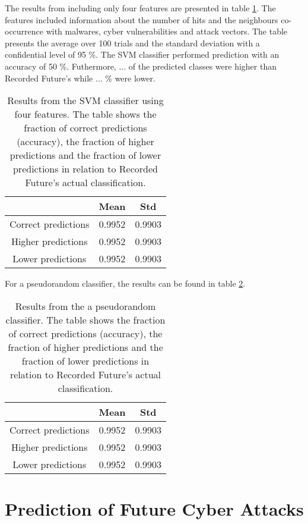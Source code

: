The results from including only four features are presented in table \ref{IpRes4Feat}. The features included information about the number of hits and the neighbours co-occurrence with malwares, cyber vulnerabilities and attack vectors. The table presents the average over 100 trials and the standard deviation with a confidential level of 95 \%. The SVM classifier performed prediction with an accuracy of 50 \%. Futhermore, ... of the predicted classes were higher than Recorded Future's while ... \% were lower. 

\begin{table}[h!]
    \centering
    \caption{Results from the SVM classifier using four features. The table shows the fraction of correct predictions (accuracy), the fraction of higher predictions and the fraction of lower predictions in relation to Recorded Future's actual classification.}
    \begin{tabular}{|c|c|c|}
    \hline
        ~   & Mean & Std  \\ \hline
        Correct predictions & 0.9952 &  0.9903 \\
        Higher predictions  & 0.9952 &  0.9903\\
        Lower predictions   & 0.9952 &  0.9903\\ \hline
    \end{tabular}
    \label{IpRes4Feat}
\end{table}

For a pseudorandom classifier, the results can be found in table \ref{randClass}.

\begin{table}[h!]
    \centering
    \caption{Results from the a pseudorandom classifier. The table shows the fraction of correct predictions (accuracy), the fraction of higher predictions and the fraction of lower predictions in relation to Recorded Future's actual classification.}
    \begin{tabular}{|c|c|c|}
    \hline
        ~   & Mean & Std  \\ \hline
        Correct predictions & 0.9952 &  0.9903 \\
        Higher predictions  & 0.9952 &  0.9903\\
        Lower predictions   & 0.9952 &  0.9903\\ \hline
    \end{tabular}
    \label{randClass}
\end{table}

\section{Prediction of Future Cyber Attacks}

